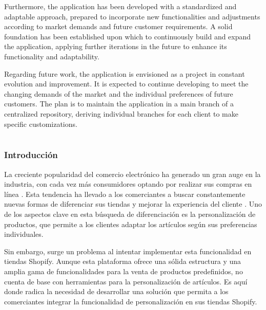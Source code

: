 \documentclass[12pt]{article}
\renewcommand\thesection{\Roman{section}}
\renewcommand\thesubsection{\thesection.\Roman{subsection}} %
\begin{document}
Furthermore, the application has been developed with a standardized and adaptable approach, prepared to incorporate new functionalities 
and adjustments according to market demands and future customer requirements. A solid foundation has been established upon which to 
continuously build and expand the application, applying further iterations in the future to enhance its functionality and adaptability.

Regarding future work, the application is envisioned as a project in constant evolution and improvement. It is expected to continue 
developing to meet the changing demands of the market and the individual preferences of future customers. The plan is to maintain 
the application in a main branch of a centralized repository, deriving individual branches for each client to make specific customizations.

\cleardoublepage

\part*{}
\renewcommand\thesection{\arabic{section}}
\renewcommand\thesubsection{\thesection.\arabic{subsection}} %
\setcounter{page}{1} %
\setcounter{section}{0} %


\section{Introducción}
La creciente popularidad del comercio electrónico ha generado un gran auge en la industria, con cada vez más consumidores optando por realizar 
sus compras en línea \cite{crecimiento-ecomerce}. Esta tendencia ha llevado a los comerciantes a buscar constantemente nuevas formas de diferenciar sus tiendas y mejorar 
la experiencia del cliente \cite{diferenciacion}. Uno de los aspectos clave en esta búsqueda de diferenciación es la personalización de productos, que permite a los 
clientes adaptar los artículos según sus preferencias individuales.

Sin embargo, surge un problema al intentar implementar esta funcionalidad en tiendas Shopify. Aunque esta plataforma ofrece una sólida estructura 
y una amplia gama de funcionalidades para la venta de productos predefinidos, no cuenta de base con herramientas para la personalización de artículos.
Es aquí donde radica la necesidad de desarrollar una solución que permita a los comerciantes integrar la funcionalidad de personalización en sus tiendas Shopify.
\end{document}
